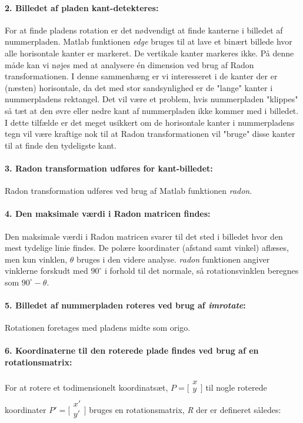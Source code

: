\paragraph{2. Billedet af pladen kant-detekteres:}
For at finde pladens rotation er det nødvendigt at finde kanterne i billedet af nummerpladen. Matlab funktionen \textit{edge} bruges til at lave et binært billede hvor alle horisontale kanter er markeret. De vertikale kanter markeres ikke. På denne måde kan vi nøjes med at analysere én dimension ved brug af Radon transformationen. I denne sammenhæng er vi interesseret i de kanter der er (næsten) horisontale, da det med stor sandsynlighed er de "lange" kanter i nummerpladens rektangel. Det vil være et problem, hvis nummerpladen "klippes" så tæt at den øvre eller nedre kant af nummerpladen ikke kommer med i billedet. I dette tilfælde er det meget usikkert om de horisontale kanter i nummerpladens tegn vil være kraftige nok til at Radon transformationen vil "bruge" disse kanter til at finde den tydeligste kant.

\paragraph{3. Radon transformation udføres for kant-billedet:} Radon transformation udføres ved brug af Matlab funktionen \textit{radon}.

\paragraph{4. Den maksimale værdi i Radon matricen findes:} Den maksimale værdi i Radon matricen svarer til det sted i billedet hvor den mest tydelige linie findes. De polære koordinater (afstand samt vinkel) aflæses, men kun vinklen, $\theta$ bruges i den videre analyse. \textit{radon} funktionen angiver vinklerne forskudt med $90^{\circ}$ i forhold til det normale, så rotationsvinklen beregnes som $90^{\circ} - \theta$.

\paragraph{5. Billedet af nummerpladen roteres ved brug af \textit{imrotate}:} Rotationen foretages med pladens midte som origo.

\paragraph{6. Koordinaterne til den roterede plade findes ved brug af en rotationsmatrix:} For at rotere et todimensionelt koordinatsæt, $P=\biggl[\begin{array}{c} x\\ y\\ \end{array}\biggr]$ til nogle roterede koordinater $P'=\biggl[\begin{array}{c} x'\\ y'\\ \end{array}\biggr]$ bruges en rotationsmatrix, \textit{R} der er defineret således:

